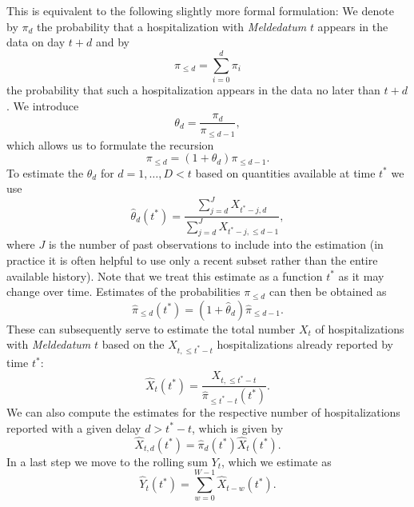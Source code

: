 \documentclass[a4paper, 11pt]{article}\usepackage[]{graphicx}\usepackage[]{color}
\begin{document}
{%
{This is equivalent to the following slightly more formal formulation:} We denote by $\pi_d$ the probability that a hospitalization with \textit{Meldedatum} $t$ appears in the data on day $t + d$ and by
$$
\pi_{\leq d} = \sum_{i = 0}^d \pi_i
$$
the probability that such a hospitalization appears in the data no later than $t + d$. We introduce
$$
\theta_d = \frac{\pi_d}{\pi_{\leq d - 1}},
$$
which allows us to formulate the recursion
$$
\pi_{\leq d} = (1 + \theta_d) \pi_{\leq d - 1}.
$$
To estimate the $\theta_d$ for $d = 1, \dots, D < t$ based on quantities available at time $t^*$ we use
$$
\hat{\theta}_d(t^*) = \frac{\sum_{j = d}^J X_{t^* - j, d}}{\sum_{j = d}^J X_{t^* - j, \leq d - 1}},
$$
where $J$ is the number of past observations to include into the estimation (in practice it is often helpful to use only a recent subset rather than the entire available history). Note that we treat this estimate as a function $t^*$ as it may change over time. Estimates of the probabilities $\pi_{\leq d}$ can then be obtained as
$$
\hat\pi_{\leq d}(t^*) = (1 + \hat\theta_d) \hat\pi_{\leq d - 1}.
$$
These can subsequently serve to estimate the total number $X_{t}$ of hospitalizations with \textit{Meldedatum} $t$ based on the $X_{t, \leq t^* - t}$ hospitalizations already reported by time $t^*$:
$$
\hat{X}_t(t^*) = \frac{X_{t, \leq t^* - t}}{\hat{\pi}_{\leq t^* - t}(t^*)}.
$$
We can also compute the estimates for the respective number of hospitalizations reported with a given delay $d > t^* - t$, which is given by
$$
\hat{X}_{t, d}(t^*) = \hat\pi_d(t^*) \hat{X}_t(t^*).
$$
In a last step we move to the rolling sum $Y_t$, which we estimate as
$$
\hat{Y}_t(t^*) = \sum_{w = 0}^{W - 1} \hat{X}_{t - w}(t^*).
$$
}
\end{document}
